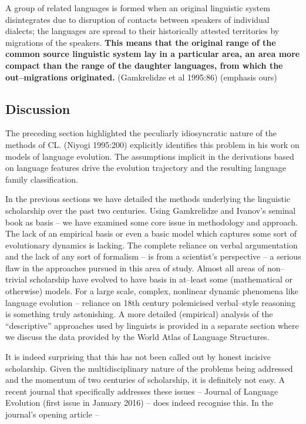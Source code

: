 \begin{myquote}
A group of related languages is formed when an original linguistic system disintegrates due to disruption of contacts between speakers of individual dialects; the languages are spread to their historically attested territories by migrations of the speakers. \textbf{This means that the original range of the common source linguistic system lay in a particular area, an area more compact than the range of the daughter languages, from which the out–migrations originated.} (Gamkrelidze et al 1995:86) (emphasis ours)
\end{myquote}


\subsection*{Discussion}

The preceding section highlighted the peculiarly idiosyncratic nature of the methods of CL. (Niyogi 1995:200) explicitly identifies this problem in his work on models of language evolution. The assumptions implicit in the derivations based on language features drive the evolution trajectory and the resulting language family classification.

In the previous sections we have detailed the methods underlying the linguistic scholarship over the past two centuries. Using Gamkrelidze and Ivanov’s seminal book as basis – we have examined some core issue in methodology and approach. The lack of an empirical basis or even a basic model which captures some sort of evolutionary dynamics is lacking. The complete reliance on verbal argumentation and the lack of any sort of formalism – is from a scientist's perspective – a serious flaw in the approaches pursued in this area of study. Almost all areas of non–trivial scholarship have evolved to have basis in at–least some (mathematical or otherwise) models. For a large scale, complex, nonlinear dynamic phenomena like language evolution – reliance on 18th century polemicised verbal–style reasoning is something truly astonishing. A more detailed (empirical) analysis of the “descriptive” approaches used by linguists is provided in a separate section where we discuss the data provided by the World Atlas of Language Structures.

It is indeed surprising that this has not been called out by honest incisive scholarship. Given the multidisciplinary nature of the problems being addressed and the momentum of two centuries of scholarship, it is definitely not easy. A recent journal that specifically addresses these issues – Journal of Language Evolution (first issue in January 2016) – does indeed recognise this. In the journal’s opening article –

